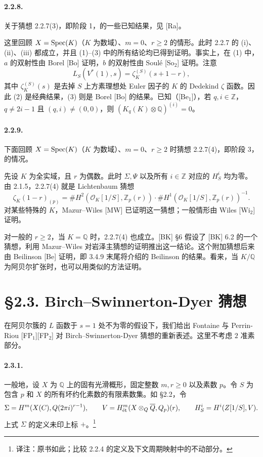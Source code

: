 \paragraph{2.2.8.} 关于猜想 2.2.7(3)，即阶段 1，的一些已知结果，见 [Ra]。

这里回顾 $X=\operatorname{Spec}(K)$（$K$ 为数域）、$m=0$、$r\ge2$ 的情形。此时 2.2.7 的 (i)、(ii)、(iii) 都成立，并且 (1)--(3) 中的所有结论均已得到证明。事实上，在 (1) 中，$a$ 的双射性由 Borel [Bo] 证明，$b$ 的双射性由 Soulé [So$_2$] 证明。注意
\[
 L_S(V^*(1),s)=\zeta_K^{(S)}(s+1-r),
\]
其中 $\zeta_K^{(S)}(s)$ 是去掉 $S$ 上方素理想处 Euler 因子的 $K$ 的 Dedekind $\zeta$ 函数。因此 (2) 是经典结果，(3) 则是 Borel [Bo] 的结果。已知（[Be$_1$]），若 $q,i\in\mathbb Z$，$q\ne2i-1$ 且 $(q,i)\ne(0,0)$，则 $(K_q(K)\otimes\mathbb Q)^{(i)}=0$。

\paragraph{2.2.9.} 下面回顾 $X=\operatorname{Spec}(K)$（$K$ 为数域）、$m=0$、$r\ge2$ 时猜想 2.2.7(4)，即阶段 3，的情况。

先设 $K$ 为全实域，且 $r$ 为偶数。此时 $\Sigma,\Psi$ 以及所有 $i\in\mathbb Z$ 对应的 $H^i_S$ 均为零。由 2.1.5，2.2.7(4) 就是 Lichtenbaum 猜想
\[
 \zeta_K(1-r)_{(p)}
 =\#H^2(\mathcal O_K[1/S],\mathbb Z_p(r))
 \cdot\#H^1(\mathcal O_K[1/S],\mathbb Z_p(r))^{-1}.
\]
对某些特殊的 $K$，Mazur--Wiles [MW] 已证明这一猜想；一般情形由 Wiles [Wi$_2$] 证明。

对一般的 $r\ge2$，当 $K=\mathbb Q$ 时，2.2.7(4) 也成立。[BK] §6 假设了 [BK] 6.2 的一个猜想，利用 Mazur--Wiles 对岩泽主猜想的证明推出这一结论。这个附加猜想后来由 Beilinson [Be] 证明，即 3.4.9 末尾将介绍的 Beilinson 的结果。看来，当 $K/\mathbb Q$ 为阿贝尔扩张时，也可以用类似的方法证明。

\section*{§2.3. Birch--Swinnerton-Dyer 猜想}
在阿贝尔簇的 $L$ 函数于 $s=1$ 处不为零的假设下，我们给出 Fontaine 与 Perrin-Riou [FP$_1$][FP$_2$] 对 Birch--Swinnerton-Dyer 猜想的重新表述。这里不考虑 $2$ 准素部分。

\paragraph{2.3.1.} 一般地，设 $X$ 为 $\mathbb Q$ 上的固有光滑概形，固定整数 $m,r\ge0$ 以及素数 $p$。令 $S$ 为包含 $p$ 和 $X$ 的所有坏约化素数的有限素数集。如 §2.2，令
\[
 \Sigma=H^m(X(C),Q(2\pi i)^{r-1}),\qquad
 V=H^m_{\mathrm{\acute et}}(X\otimes_{Q}\overline{Q},Q_p)(r),
 \qquad H^i_S=H^i(Z[1/S],V).
\]
上式 $\Sigma$ 的定义未印上标 $+$。\footnote{译注：原书如此；比较 2.2.4 的定义及下文周期映射中的不动部分。}

